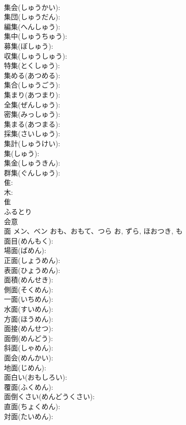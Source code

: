 \documentclass[8pt]{extreport}
\begin{document}
\begin{CJK}{UTF8}{min}
\\	集会(しゅうかい): 
\\	集団(しゅうだん): 
\\	編集(へんしゅう): 
\\	集中(しゅうちゅう): 
\\	募集(ぼしゅう): 
\\	収集(しゅうしゅう): 
\\	特集(とくしゅう): 
\\	集める(あつめる): 
\\	集合(しゅうごう): 
\\	集まり(あつまり): 
\\	全集(ぜんしゅう): 
\\	密集(みっしゅう): 
\\	集まる(あつまる): 
\\	採集(さいしゅう): 
\\	集計(しゅうけい): 
\\	集(しゅう): 
\\	集金(しゅうきん): 
\\	群集(ぐんしゅう): 
\\	隹: 
\\	木: 
\\	隹	
\\	ふるとり	
\\	会意 
\\	面	メン、ベン	おも、おもて、つら	お, ずら, ほおつき, も	
\\	面目(めんもく): 
\\	場面(ばめん): 
\\	正面(しょうめん): 
\\	表面(ひょうめん): 
\\	面積(めんせき): 
\\	側面(そくめん): 
\\	一面(いちめん): 
\\	水面(すいめん): 
\\	方面(ほうめん): 
\\	面接(めんせつ): 
\\	面倒(めんどう): 
\\	斜面(しゃめん): 
\\	面会(めんかい): 
\\	地面(じめん): 
\\	面白い(おもしろい): 
\\	覆面(ふくめん): 
\\	面倒くさい(めんどうくさい): 
\\	直面(ちょくめん): 
\\	対面(たいめん): 

\end{CJK}
\end{document}
